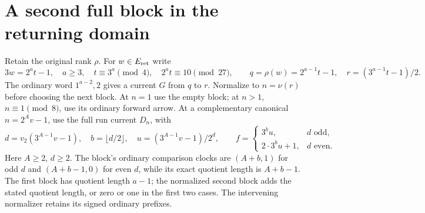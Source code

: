 \documentclass[11pt]{article}
\begin{document}
\section{A second full block in the returning domain}
Retain the original rank $\rho$. For $w\in E_{\rm ret}$ write
\[
 3w=2^at-1,\quad a\ge3,\quad t\equiv3^a\pmod4,\quad
 2^at\equiv10\pmod{27},\qquad
 q=\rho(w)=2^{a-1}t-1,\quad r=(3^{a-1}t-1)/2.
\]
The ordinary word $1^{a-2},2$ gives a current $G$ from $q$ to $r$.
Normalize to $n=\nu(r)$ before choosing the next block. At $n=1$ use
the empty block; at $n>1$, $n\equiv1\pmod8$, use its ordinary forward
arrow. At a complementary canonical $n=2^Av-1$, use the full run
current $D_n$, with
\[
 d=v_2(3^{A-1}v-1),\quad b=\lfloor d/2\rfloor,\quad
 u=(3^{A-1}v-1)/2^d,\qquad
 f=\begin{cases}3^bu,&d\text{ odd},\\2\cdot3^bu+1,&d\text{ even}.
 \end{cases}
\]
Here $A\ge2$, $d\ge2$. The block's ordinary comparison clocks are
$(A+b,1)$ for odd $d$ and $(A+b-1,0)$ for even $d$, while its exact
quotient length is $A+b-1$. The first block has quotient length $a-1$;
the normalized second block adds the stated quotient length, or zero
or one in the first two cases. The intervening normalizer retains its
signed ordinary prefixes.
\end{document}
